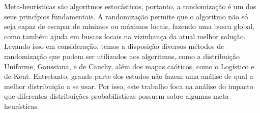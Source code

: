 Meta-heurísticas são algoritmos estocásticos, portanto, a randomização é um dos seus princípios fundamentais. A randomização permite que o algoritmo não só seja capaz de escapar de mínimos ou máximos locais, fazendo uma busca global, como também ajuda em buscas locais na vizinhança da atual melhor solução. Levando isso em consideração, temos a disposição diversos métodos de randomização que podem ser utilizados nos algoritmos, como a distribuição Uniforme, Gaussiana, e de Cauchy, além dos mapas caóticos, como o Logístico e de Kent. Entretanto, grande parte dos estudos não fazem uma análise de qual a melhor distribuição a se usar. Por isso, este trabalho foca na análise do impacto que diferentes distribuições probabilísticas possuem sobre algumas meta-heurísticas.